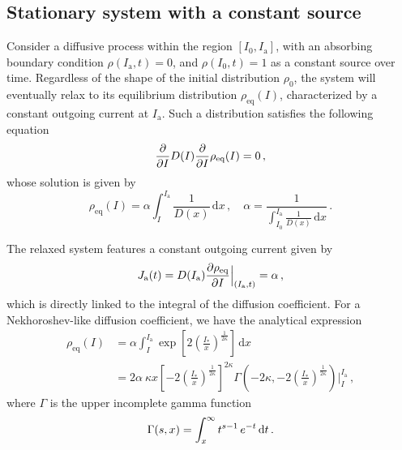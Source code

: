 {%

\subsection{Stationary system with a constant  source}\label{subsec:system_infinite_regime}


Consider a diffusive process within the region $[I_0, I_\mathrm{a}]$, with an absorbing boundary condition $\rho(I_\mathrm{a}, t) = 0$, and $\rho(I_0, t) = 1$ as a constant source over time. Regardless of the shape of the initial distribution $\rho_0$, the system will eventually relax to its equilibrium distribution $\rho_\text{eq}(I)$, characterized by a constant outgoing current at $I_\mathrm{a}$. Such a distribution satisfies the following equation
\begin{equation}
    \pdv{I} D(I) \pdv{I} \rho_{\text{eq}}(I) = 0 \,,
\end{equation}
whose solution is given by
\begin{equation}
    \rho_\text{eq}(I) = \alpha \int_I^{I_\mathrm{a}} \frac{1}{D(x)}\,\mathrm{d}x \,, \quad \alpha = \frac{1}{ \displaystyle{\int_{I_0}^{I_\mathrm{a}} \frac{1}{D(x)}\,\mathrm{d}x}} \, .
    \label{eq:equilibrium_stationary_distribution}
\end{equation}

The relaxed system features a constant outgoing current given by
\begin{equation}
    J_\mathrm{a}(t) = D(I_\mathrm{a})\pdv{\rho_\text{eq}}{I}\Bigr|_{(I_\mathrm{a},t)} = \alpha\,,
    \label{eq:equilibrium_stationary_current}
\end{equation} 
which is directly linked to the integral of the diffusion coefficient. For a Nekhoroshev-like diffusion coefficient, we have the analytical expression
\begin{equation}
    \begin{aligned}
        \rho_\text{eq}(I) &= \alpha \int_I^{I_\mathrm{a}} \exp\left[2\left(\frac{I_\ast}{x}\right)^{\frac{1}{2\kappa}}\right] \,\mathrm{d}x \\
        &= 2\alpha\ \kappa x \left[-2\left(\frac{I_\ast}{x}\right)^{\frac{1}{2\kappa}}\right]^{2\kappa} \Gamma\left(-2\kappa, -2\left(\frac{I_\ast}{x}\right)^{\frac{1}{2\kappa}}\right)\Bigg|_I^{I_\mathrm{a}}\,,
    \end{aligned}
\end{equation}
where $\Gamma$ is the upper incomplete gamma function
\begin{equation}
    \Gamma(s,x) = \int_x^{\infty} t^{s-1}\,e^{-t}\,{\rm d}t \,.
\end{equation}

}
